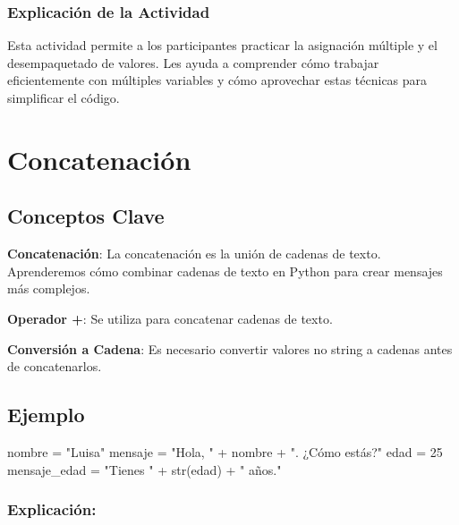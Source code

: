 \documentclass[
  a4paper,
  DIV=11,
  numbers=noendperiod,
  onepage,
  openany]{scrreprt}
\newenvironment{Shaded}{\begin{snugshade}}{\end{snugshade}}
\newcommand{\BuiltInTok}[1]{\textcolor[rgb]{0.00,0.23,0.31}{#1}}
\newcommand{\DecValTok}[1]{\textcolor[rgb]{0.68,0.00,0.00}{#1}}
\newcommand{\NormalTok}[1]{\textcolor[rgb]{0.00,0.23,0.31}{#1}}
\newcommand{\OperatorTok}[1]{\textcolor[rgb]{0.37,0.37,0.37}{#1}}
\newcommand{\StringTok}[1]{\textcolor[rgb]{0.13,0.47,0.30}{#1}}
\begin{document}
\subsection{Explicación de la
Actividad}\label{explicaciuxf3n-de-la-actividad-2}

Esta actividad permite a los participantes practicar la asignación
múltiple y el desempaquetado de valores. Les ayuda a comprender cómo
trabajar eficientemente con múltiples variables y cómo aprovechar estas
técnicas para simplificar el código.

\chapter{Concatenación}\label{concatenaciuxf3n}

\section{Conceptos Clave}\label{conceptos-clave-6}

\textbf{Concatenación}: La concatenación es la unión de cadenas de
texto. Aprenderemos cómo combinar cadenas de texto en Python para crear
mensajes más complejos.

\textbf{Operador +}: Se utiliza para concatenar cadenas de texto.

\textbf{Conversión a Cadena}: Es necesario convertir valores no string a
cadenas antes de concatenarlos.

\section{Ejemplo}\label{ejemplo-2}

\begin{Shaded}
\begin{Highlighting}[]
\NormalTok{nombre }\OperatorTok{=} \StringTok{"Luisa"}
\NormalTok{mensaje }\OperatorTok{=} \StringTok{"Hola, "} \OperatorTok{+}\NormalTok{ nombre }\OperatorTok{+} \StringTok{". ¿Cómo estás?"}
\NormalTok{edad }\OperatorTok{=} \DecValTok{25}
\NormalTok{mensaje\_edad }\OperatorTok{=} \StringTok{"Tienes "} \OperatorTok{+} \BuiltInTok{str}\NormalTok{(edad) }\OperatorTok{+} \StringTok{" años."}
\end{Highlighting}
\end{Shaded}

\subsection{Explicación:}\label{explicaciuxf3n-4}
\end{document}
